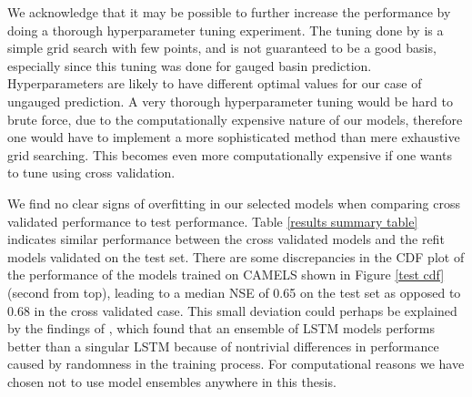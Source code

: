 We acknowledge that it may be possible to further increase the performance by doing 
a thorough hyperparameter tuning experiment. The tuning done by \citet{lstm_second_paper} 
is a simple grid search with few points, and is not guaranteed to be a good basis, 
especially since this tuning was done for gauged basin prediction. Hyperparameters 
are likely to have different optimal values for our case of ungauged prediction. A very thorough 
hyperparameter tuning would be hard to brute force, due to the computationally 
expensive nature of our models, therefore one would have to implement a more sophisticated 
method than mere exhaustive grid searching. This becomes even more computationally 
expensive if one wants to tune using cross validation.

We find no clear signs of overfitting in our selected models when comparing 
cross validated performance to test performance. Table 
\ref{results summary table} indicates 
similar performance between the cross validated models and the refit models 
validated on the test set. There are some discrepancies in the CDF plot of 
the performance of the models trained on CAMELS 
shown in Figure \ref{test cdf} (second from top), leading to a median NSE of 
0.65 on the test set as opposed to $0.68$ in the cross validated case. This small 
deviation could perhaps be explained by the findings of \citet{lstm_second_paper},
 which found that an ensemble of LSTM models performs better than a singular LSTM 
 because of nontrivial differences in performance caused by randomness in the 
 training process. For computational reasons we have chosen not to use model 
 ensembles anywhere in this thesis.

